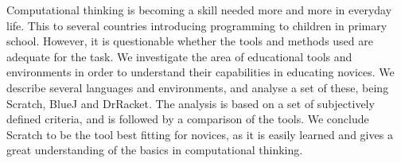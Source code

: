 Computational thinking is becoming a skill needed more and more in everyday life. This  to several countries introducing programming to children in primary school. However, it is questionable whether the tools and methods used are adequate for the task. We investigate the area of educational tools and environments in order to understand their capabilities in educating novices. We describe several languages and environments, and analyse a set of these, being Scratch, BlueJ and DrRacket. The analysis is based on a set of subjectively defined criteria, and is followed by a comparison of the tools. We conclude Scratch to be the tool best fitting for novices, as it is easily learned and gives a great understanding of the basics in computational thinking.